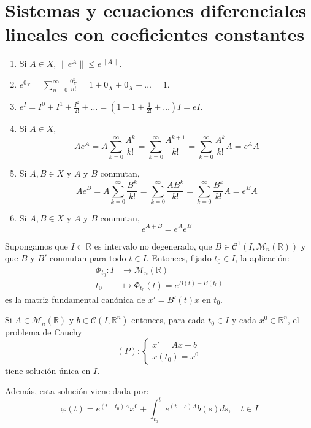 \chapter{Sistemas y ecuaciones diferenciales lineales con coeficientes constantes}
\begin{properties}[Exponencial]
    \hfill
    \begin{enumerate}
        \item Si $A \in X$, $\|e^A\| \leq e^{\|A\|}$.
        \item $e^{0_X} = \sum_{n=0}^\infty \frac{0_X^n}{n!} = 1 + 0_X + 0_X + \dots = 1$.
        \item $e^I = I^0 + I^1 + \frac{I^2}{2!} + \dots = (1 + 1 + \frac{1}{2!} + \dots)I = eI$.
        \item Si $A \in X$,
              $$Ae^A = A\sum_{k=0}^\infty \frac{A^k}{k!} = \sum_{k=0}^\infty \frac{A^{k+1}}{k!} = \sum_{k=0}^\infty \frac{A^k}{k!} A = e^AA$$
        \item Si $A, B \in X$ y $A$ y $B$ conmutan,
              $$Ae^B = A\sum_{k=0}^\infty \frac{B^k}{k!} = \sum_{k=0}^\infty \frac{AB^k}{k!} = \sum_{k=0}^\infty \frac{B^k}{k!}A = e^BA$$
        \item Si $A, B \in X$ y $A$ y $B$ conmutan,
              $$e^{A+B} = e^Ae^B$$
    \end{enumerate}
\end{properties}

\begin{theorem}
    Supongamos que $I \subset \mathbb{R}$ es intervalo no degenerado, que $B \in \mathcal{C}^1(I, \mathcal{M}_n(\mathbb{R}))$ y que $B$ y $B'$ conmutan para todo $t \in I$.
    Entonces, fijado $t_0 \in I$, la aplicación:
    \begin{align*}
        \Phi_{t_0}: I & \to \mathcal{M}_n(\mathbb{R})             \\
        t_0           & \mapsto \Phi_{t_0}(t) = e^{B(t) - B(t_0)}
    \end{align*}
    es la matriz fundamental canónica de $x' = B'(t)x$ en $t_0$.
\end{theorem}

\begin{corollary}
    Si $A \in \mathcal{M}_n(\mathbb{R})$ y $b \in \mathcal{C}(I, \mathbb{R}^n)$ entonces, para cada $t_0 \in I$ y cada $x^0 \in \mathbb{R}^n$, el problema de Cauchy
    $$(P): \begin{cases}
            x' = Ax + b \\
            x(t_0) = x^0
        \end{cases}$$
    tiene solución única en $I$.

    Además, esta solución viene dada por:
    $$\varphi(t) = e^{(t-t_0)A}x^0 + \int_{t_0}^t e^{(t-s)A}b(s)ds, \quad t \in I$$
\end{corollary}

